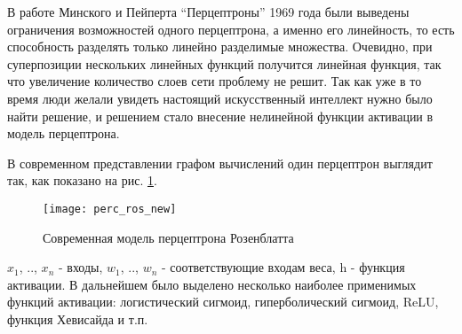 \par
В работе Минского и Пейперта “Перцептроны”\cite{minsky} 1969 года были выведены ограничения возможностей одного перцептрона, а именно его линейность, то есть способность разделять только линейно разделимые множества. Очевидно, при суперпозиции нескольких линейных функций получится линейная функция, так что увеличение количество слоев сети проблему не решит. Так как уже в то время люди желали увидеть настоящий искусственный интеллект нужно было найти решение, и решением стало внесение нелинейной функции активации в модель перцептрона.
\par
В современном представлении графом вычислений один перцептрон выглядит так, как показано на рис. \ref{hist:rosnew}.
\begin{figure}[H]
	\centering
	\texttt{[image: perc\_ros\_new]}
	\caption{Современная модель перцептрона Розенблатта}
	\label{hist:rosnew}
\end{figure}
$x_1$, .., $x_n$ - входы, $w_1$, .., $w_n$ - соответствующие входам веса, h - функция активации. В дальнейшем было выделено несколько наиболее применимых функций активации: логистический сигмоид, гиперболический сигмоид, ReLU, функция Хевисайда и т.п.
